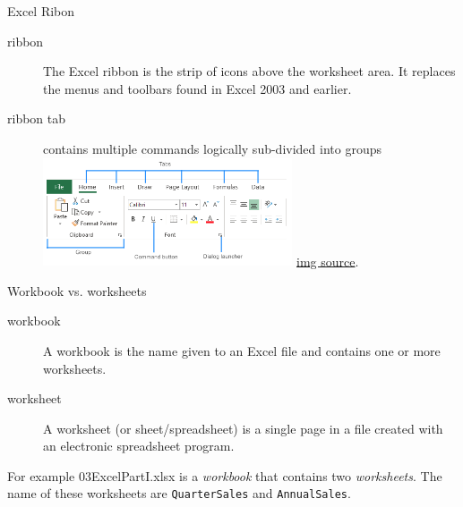 \documentclass[xcolor=svgnames]{beamer}
\begin{document}
%


\begin{frame}{Excel Ribon}
\begin{description}
\item[ribbon] The Excel ribbon is the strip of icons above the worksheet area. It replaces the menus and toolbars found in Excel 2003 and earlier.
\item[ribbon tab] contains multiple commands logically sub-divided into groups\\
\includegraphics[width=0.6\textwidth]{ribbon} \href{https://www.ablebits.com/office-addins-blog/2019/07/02/excel-ribbon-guide/}{\scriptsize img source}.
\end{description}
\end{frame}





\begin{frame}{Workbook vs. worksheets}
\begin{description}
\item[workbook] A workbook is the name given to an Excel file and contains one or more worksheets.
\medskip
\item[worksheet] A worksheet (or sheet/spreadsheet) is a single page in a file created with an electronic spreadsheet program.
\medskip
\end{description}
For example {\sf 03ExcelPartI.xlsx}  is a \emph{workbook} that contains two \emph{worksheets}.  The name of these worksheets are {\tt QuarterSales} and {\tt AnnualSales}.
\end{frame}
\end{document}
